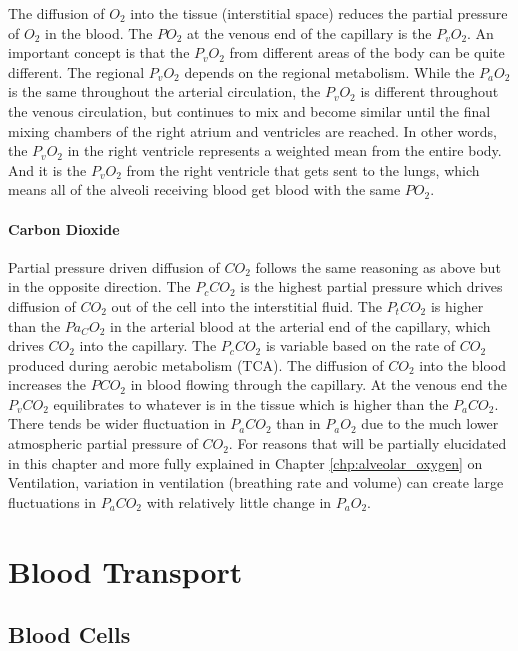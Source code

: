 The diffusion of $O_2$ into the tissue (interstitial space) reduces the partial pressure of $O_2$ in the blood. The $PO_2$ at the venous end of the capillary is the $P_vO_2$. An important concept is that the $P_vO_2$ from different areas of the body can be quite different. The regional $P_vO_2$ depends on the regional metabolism. While the $P_aO_2$ is the same throughout the arterial circulation, the $P_vO_2$ is different throughout the venous circulation, but continues to mix and become similar until the final mixing chambers of the right atrium and ventricles are reached. In other words, the $P_vO_2$ in the right ventricle represents a weighted mean from the entire body. And it is the $P_vO_2$ from the right ventricle that gets sent to the lungs, which means all of the alveoli receiving blood get blood with the same $PO_2$.

\paragraph{Carbon Dioxide}

Partial pressure driven diffusion of $CO_2$ follows the same reasoning as above but in the opposite direction. The $P_cCO_2$ is the highest partial pressure which drives diffusion of $CO_2$ out of the cell into the interstitial fluid. The $P_tCO_2$ is higher than the $Pa_CO_2$ in the arterial blood at the arterial end of the capillary, which drives $CO_2$ into the capillary. The $P_cCO_2$ is variable based on the rate of $CO_2$ produced during aerobic metabolism (TCA). The diffusion of $CO_2$ into the blood increases the $PCO_2$ in blood flowing through the capillary. At the venous end the $P_vCO_2$ equilibrates to whatever is in the tissue which is higher than the $P_aCO_2$. There tends be wider fluctuation in $P_aCO_2$ than in $P_aO_2$ due to the much lower atmospheric partial pressure of $CO_2$. For reasons that will be partially elucidated in this chapter and more fully explained in Chapter \ref{chp:alveolar_oxygen} on Ventilation, variation in ventilation (breathing rate and volume) can create large fluctuations in $P_aCO_2$ with relatively little change in $P_aO_2$. 







\section{Blood Transport}
\subsection{Blood Cells}

